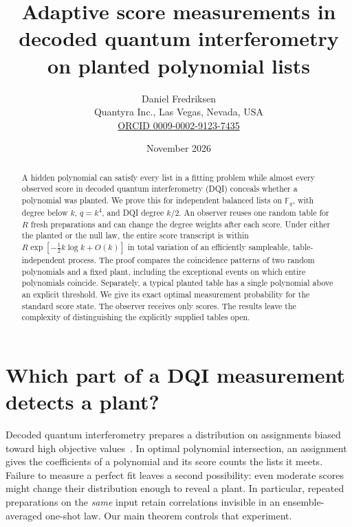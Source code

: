 \documentclass[11pt]{article}
\title{Adaptive score measurements in decoded quantum interferometry on planted polynomial lists}
\author{Daniel Fredriksen\\{\small Quantyra Inc., Las Vegas, Nevada, USA}\\
{\small \href{https://orcid.org/0009-0002-9123-7435}{ORCID 0009-0002-9123-7435}}}
\date{November 2026}
\newcommand{\F}{\mathbb F}
\begin{document}
\maketitle
\begin{abstract}
A hidden polynomial can satisfy every list in a fitting problem while almost every observed score in decoded quantum interferometry (DQI) conceals whether a polynomial was planted. We prove this for independent balanced lists on $\F_q$, with degree below $k$, $q=k^4$, and DQI degree $k/2$. An observer reuses one random table for $R$ fresh preparations and can change the degree weights after each score. Under either the planted or the null law, the entire score transcript is within $R\exp[-\tfrac12 k\log k+O(k)]$ in total variation of an efficiently sampleable, table-independent process. The proof compares the coincidence patterns of two random polynomials and a fixed plant, including the exceptional events on which entire polynomials coincide. Separately, a typical planted table has a single polynomial above an explicit threshold. We give its exact optimal measurement probability for the standard score state. The observer receives only scores. The results leave the complexity of distinguishing the explicitly supplied tables open.
\end{abstract}

\section{Which part of a DQI measurement detects a plant?}
Decoded quantum interferometry prepares a distribution on assignments biased toward high objective values~\cite{jordan}. In optimal polynomial intersection, an assignment gives the coefficients of a polynomial and its score counts the lists it meets. Failure to measure a perfect fit leaves a second possibility: even moderate scores might change their distribution enough to reveal a plant. In particular, repeated preparations on the \emph{same} input retain correlations invisible in an ensemble-averaged one-shot law. Our main theorem controls that experiment.
\end{document}
